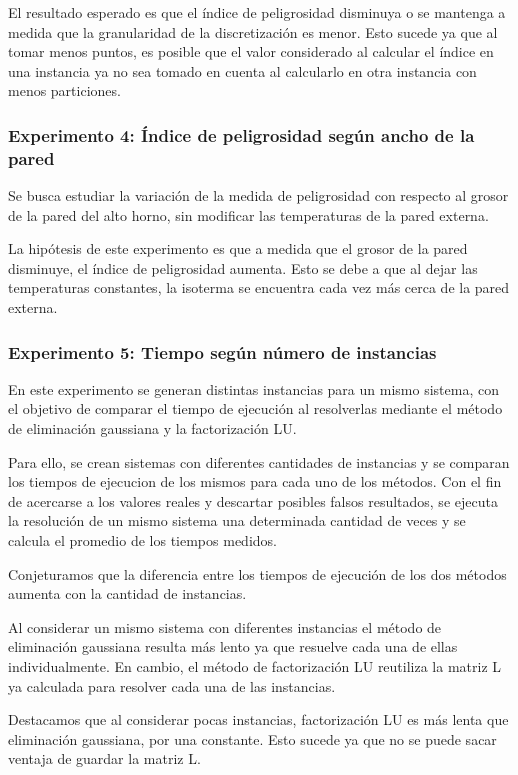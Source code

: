     El resultado esperado es que el índice de peligrosidad disminuya o se mantenga a medida que la granularidad de la discretización es menor. Esto sucede ya que al tomar menos puntos, es posible que el valor considerado al calcular el índice en una instancia ya no sea tomado en cuenta al calcularlo en otra instancia con menos particiones.

    \subsubsection*{Experimento 4: Índice de peligrosidad según ancho de la pared}
    Se busca estudiar la variación de la medida de peligrosidad con respecto al grosor de la pared del alto horno, sin modificar las temperaturas de la pared externa.

    La hipótesis de este experimento es que a medida que el grosor de la pared disminuye, el índice de peligrosidad aumenta. Esto se debe a que al dejar las temperaturas constantes, la isoterma se encuentra cada vez más cerca de la pared externa.

  	\subsubsection*{Experimento 5: Tiempo según número de instancias}
  	En este experimento se generan distintas instancias para un mismo sistema, con el objetivo de comparar el tiempo de ejecución al resolverlas mediante el método de eliminación gaussiana y la factorización LU. 

  	Para ello, se crean sistemas con diferentes cantidades de instancias y se comparan los tiempos de ejecucion de los mismos para cada uno de los métodos. Con el fin de acercarse a los valores reales y descartar posibles falsos resultados, se ejecuta la resolución de un mismo sistema una determinada cantidad de veces y se calcula el promedio de los tiempos medidos.

    Conjeturamos que la diferencia entre los tiempos de ejecución de los dos métodos aumenta con la cantidad de instancias. 

    Al considerar un mismo sistema con diferentes instancias el método de eliminación gaussiana resulta más lento ya que resuelve cada una de ellas individualmente. En cambio, el método de factorización LU reutiliza la matriz L ya calculada para resolver cada una de las instancias.

    Destacamos que al considerar pocas instancias, factorización LU es más lenta que eliminación gaussiana, por una constante. Esto sucede ya que no se puede sacar ventaja de guardar la matriz L.


